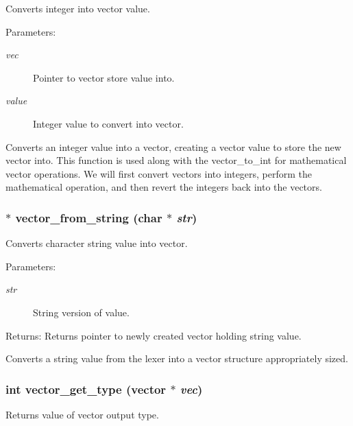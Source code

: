 Converts integer into vector value. 

\begin{Desc}
\item[Parameters:]
\begin{description}
\item[{\em vec}]Pointer to vector store value into. \item[{\em value}]Integer value to convert into vector.\end{description}
\end{Desc}
Converts an integer value into a vector, creating a vector value to store the new vector into. This function is used along with the vector\_\-to\_\-int for mathematical vector operations. We will first convert vectors into integers, perform the mathematical operation, and then revert the integers back into the vectors. 
\subsubsection{$\ast$ vector\_\-from\_\-string (char $\ast$ {\em str})}\label{vector_8c_a34}


Converts character string value into vector. 

\begin{Desc}
\item[Parameters:]
\begin{description}
\item[{\em str}]String version of value.\end{description}
\end{Desc}
\begin{Desc}
\item[Returns:]Returns pointer to newly created vector holding string value.\end{Desc}
Converts a string value from the lexer into a vector structure appropriately sized. 
\subsubsection{\setlength{\rightskip}{0pt plus 5cm}int vector\_\-get\_\-type ({\bf vector} $\ast$ {\em vec})}\label{vector_8c_a28}


Returns value of vector output type. 

